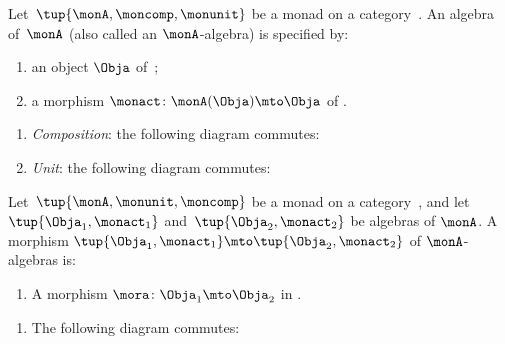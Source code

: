 \begin{ctdefinition}
    \label{def:monad-algebra}
    Let~$\tup{\monA, \moncomp, \monunit}$ be a monad on a category~\CatC.
    An algebra of~$\monA$ (also called an $\monA$-algebra) is specified by: \

    \constit
    \begin{enumerate}
        \item an object $\Obja$ of~\CatC;
        \item a morphism $\monact\colon \monA(\Obja) \mto \Obja$ of \CatC.
    \end{enumerate}
    \condit
    \begin{enumerate}
        \item \emph{Composition}: the following diagram commutes:
        \item \emph{Unit}: the following diagram commutes:

    \end{enumerate}
\end{ctdefinition}



\begin{ctdefinition}
    \label{def:algebramorphism}
    Let~$\tup{\monA, \monunit, \moncomp}$ be a monad on a category~\CatC, and let~$\tup{\Obja_1, \monact_1}$ and~$\tup{\Obja_2, \monact_2}$ be algebras of $\monA$.
    A morphism $\tup{\Obja_1, \monact_1} \mto \tup{\Obja_2, \monact_2}$ of $\monA$-algebras is: \

    \constit
    \begin{enumerate}
        \item A morphism $\mora \colon \Obja_1 \mto \Obja_2$ in \CatC.
    \end{enumerate}
    \condit
    \begin{enumerate}
        \item The following diagram commutes:

    \end{enumerate}
\end{ctdefinition}

